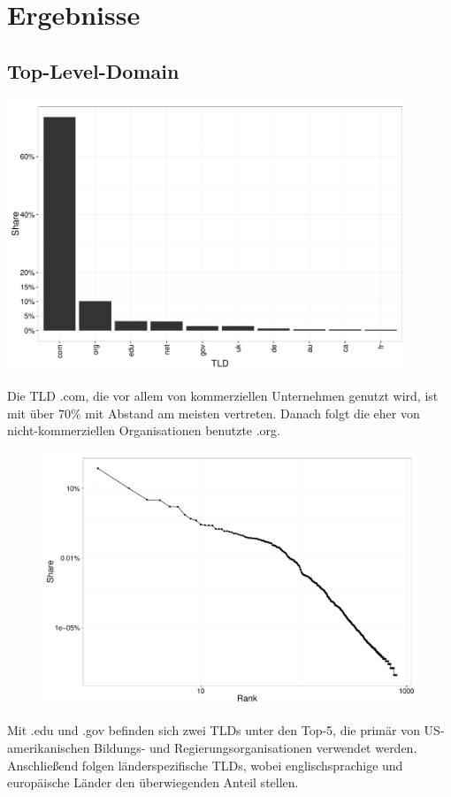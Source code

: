 \documentclass[a4paper,12pt,titlepage=false]{scrreprt}
\begin{document}
\chapter{Ergebnisse}

\section{Top-Level-Domain}

\begin{center}
    \includegraphics[width=0.9\textwidth]{plots/plot_tld_top10}
\end{center}

\noindent
Die TLD .com, die vor allem von kommerziellen Unternehmen genutzt wird, ist mit über 70\% mit Abstand am meisten vertreten. Danach folgt die eher von nicht-kommerziellen Organisationen benutzte .org.

\begin{figure}
    \label{wrap-fig:2}
    \includegraphics[width=.63\textwidth]{plots/plot_tld_zipf}
\end{figure}

Mit .edu und .gov befinden sich zwei TLDs unter den Top-5, die primär von US-amerikanischen Bildungs- und Regierungsorganisationen verwendet werden. Anschließend folgen länderspezifische TLDs, wobei englischsprachige und europäische Länder den überwiegenden Anteil stellen.
\end{document}
